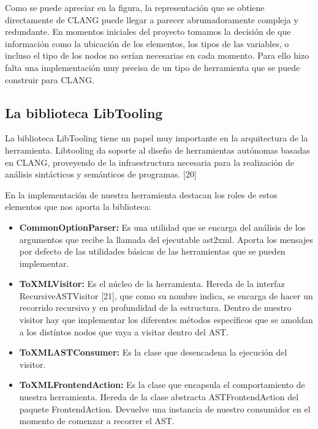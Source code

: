 

Como se puede apreciar en la figura, la representaci\'on que se obtiene directamente de CLANG puede llegar a parecer abrumadoramente compleja y redundante. En momentos iniciales del proyecto tomamos la decisi\'on de que informaci\'on como la ubicaci\'on de los elementos, los tipos de las variables, o incluso el tipo de los nodos no ser\'ian necesarias en cada momento. Para ello hizo falta una implementaci\'on muy precisa de un tipo de herramienta que se puede construir para CLANG.

\subsection{La biblioteca LibTooling}

La biblioteca LibTooling tiene un papel muy importante en la arquitectura de la herramienta. Libtooling da soporte al dise\~no de herramientas aut\'onomas basadas en CLANG, proveyendo de la infraestructura necesaria para la realizaci\'on de an\'alisis sint\'acticos y sem\'anticos de programas. [20]

En la implementaci\'on de nuestra herramienta destacan los roles de estos elementos que nos aporta la biblioteca:

\begin{itemize}
\item \textbf{CommonOptionParser:} Es una utilidad que se encarga del an\'alisis de
los argumentos que recibe la llamada del ejecutable ast2xml. Aporta los
mensajes por defecto de las utilidades b\'asicas de las herramientas que
se pueden implementar.
\item \textbf{ToXMLVisitor:} Es el n\'ucleo de la herramienta. Hereda de la interfaz RecursiveASTVisitor [21], que como su nombre indica, se encarga de hacer un recorrido recursivo y en profundidad de la estructura. Dentro de nuestro visitor hay que implementar los diferentes m\'etodos espec\'ificos que se amoldan a los dist\'intos nodos que vaya a visitar dentro del AST.
\item \textbf{ToXMLASTConsumer:} Es la clase que desencadena la ejecuci\'on del visitor.
\item \textbf{ToXMLFrontendAction:} Es la clase que encapsula el comportamiento de nuestra herramienta. Hereda de la clase abstracta ASTFrontendAction del paquete FrontendAction. Devuelve una instancia de nuestro consumidor en el momento de comenzar a recorrer el AST.
\end{itemize}

